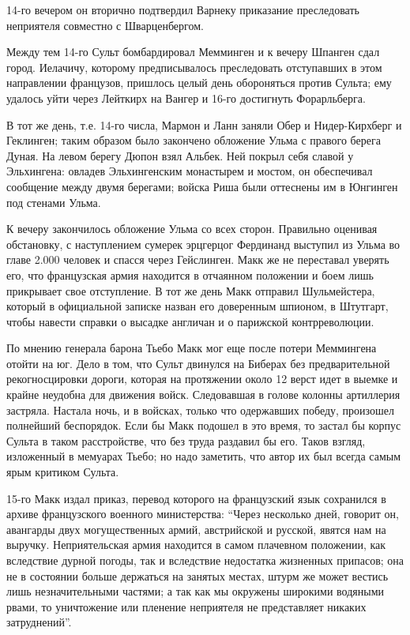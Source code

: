 \documentclass[
  oneside,
  12pt,
  titlepage]{book}
\begin{document}
14-го вечером он вторично подтвердил Варнеку приказание преследовать неприятеля совместно с Шварценбергом.

Между тем 14-го Сульт бомбардировал Мемминген и к вечеру Шпанген сдал город. Иелачичу, которому предписывалось преследовать отступавших в этом направлении французов, пришлось целый день обороняться против Сульта; ему удалось уйти через Лейткирх на Вангер и 16-го достигнуть Форарльберга.

В тот же день, т.е. 14-го числа, Мармон и Ланн заняли Обер и Нидер-Кирхберг и Геклинген; таким образом было закончено обложение Ульма с правого берега Дуная. На левом берегу Дюпон взял Альбек. Ней покрыл себя славой у Эльхингена: овладев Эльхингенским монастырем и мостом, он обеспечивал сообщение между двумя берегами; войска Риша были оттеснены им в Юнгинген под стенами Ульма.

К вечеру закончилось обложение Ульма со всех сторон. Правильно оценивая обстановку, с наступлением сумерек эрцгерцог Фердинанд выступил из Ульма во главе 2.000 человек и спасся через Гейслинген. Макк же не переставал уверять его, что французская армия находится в отчаянном положении и боем лишь прикрывает свое отступление. В тот же день Макк отправил Шульмейстера, который в официальной записке назван его доверенным шпионом, в Штутгарт, чтобы навести справки о высадке англичан и о парижской контрреволюции.

По мнению генерала барона Тьебо Макк мог еще после потери Меммингена отойти на юг. Дело в том, что Сульт двинулся на Биберах без предварительной рекогносцировки дороги, которая на протяжении около 12 верст идет в выемке и крайне неудобна для движения войск. Следовавшая в голове колонны артиллерия застряла. Настала ночь, и в войсках, только что одержавших победу, произошел полнейший беспорядок. Если бы Макк подошел в это время, то застал бы корпус Сульта в таком расстройстве, что без труда раздавил бы его. Таков взгляд, изложенный в мемуарах Тьебо; но надо заметить, что автор их был всегда самым ярым критиком Сульта.

15-го Макк издал приказ, перевод которого на французский язык сохранился в архиве французского военного министерства: ``Через несколько дней, говорит он, авангарды двух могущественных армий, австрийской и русской, явятся нам на выручку. Неприятельская армия находится в самом плачевном положении, как вследствие дурной погоды, так и вследствие недостатка жизненных припасов; она не в состоянии больше держаться на занятых местах, штурм же может вестись лишь незначительными частями; а так как мы окружены широкими водяными рвами, то уничтожение или пленение неприятеля не представляет никаких затруднений''.
\end{document}
